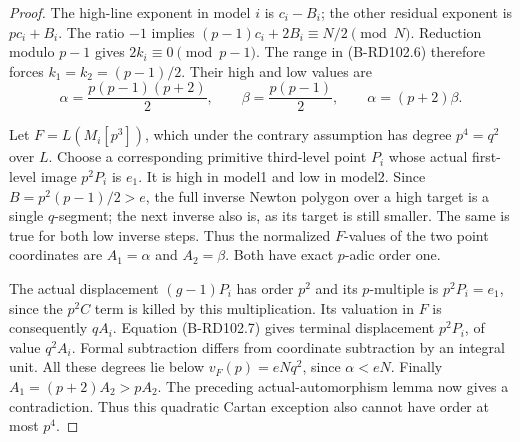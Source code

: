 \begin{proof}
The high-line exponent in model $i$ is $c_i-B_i$;
the other residual exponent is $pc_i+B_i$.
The ratio $-1$ implies
$(p-1)c_i+2B_i\equiv N/2\pmod N$.
Reduction modulo $p-1$ gives $2k_i\equiv0\pmod{p-1}$.
The range in (B-RD102.6) therefore forces
$k_1=k_2=(p-1)/2$. Their high and low values are
\[
 \alpha=\frac{p(p-1)(p+2)}2,\qquad
 \beta=\frac{p(p-1)}2,\qquad \alpha=(p+2)\beta .
                                                        \tag{B-RD102.8}
\]

Let $F=L(M_i[p^3])$, which under the contrary
assumption has degree $p^4=q^2$ over $L$.
Choose a corresponding primitive third-level point
$P_i$ whose actual first-level image $p^2P_i$
is $e_1$. It is high in model1 and low in model2.
Since $B=p^2(p-1)/2>e$, the full inverse Newton
polygon over a high target is a single $q$-segment;
the next inverse also is, as its target is still smaller.
The same is true for both low inverse steps.
Thus the normalized $F$-values of the two point
coordinates are $A_1=\alpha$ and $A_2=\beta$.
Both have exact $p$-adic order one.

The actual displacement $(g-1)P_i$ has order $p^2$
and its $p$-multiple is $p^2P_i=e_1$, since the
$p^2C$ term is killed by this multiplication.
Its valuation in $F$ is consequently $qA_i$.
Equation (B-RD102.7) gives terminal displacement
$p^2P_i$, of value $q^2A_i$.
Formal subtraction differs from coordinate subtraction
by an integral unit. All these degrees lie below
$v_F(p)=eNq^2$, since $\alpha<eN$.
Finally $A_1=(p+2)A_2>pA_2$.
The preceding actual-automorphism lemma now gives
a contradiction. Thus this quadratic Cartan exception
also cannot have order at most $p^4$.
\end{proof}

